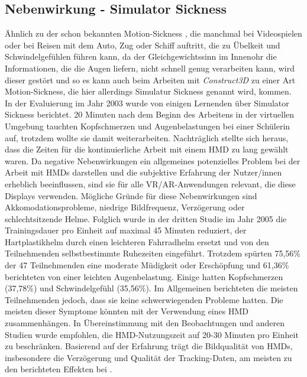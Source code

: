 \documentclass[deutsch]{llncs}
\begin{document}
\subsection{Nebenwirkung - Simulator Sickness}
Ähnlich zu der schon bekannten Motion-Sickness \cite{motionsickness}, die manchmal bei Videospielen oder bei Reisen mit dem Auto, Zug oder Schiff auftritt, die zu Übelkeit und Schwindelgefühlen führen kann, da der Gleichgewichtssinn im Innenohr die Informationen, die die Augen liefern, nicht schnell genug verarbeiten kann, wird dieser gestört und so es kann auch beim Arbeiten mit \emph{Construct3D} zu einer Art Motion-Sickness, die hier allerdings
Simulatur Sickness genannt wird, kommen.
 \\
In der Evaluierung im Jahr 2003 wurde von einigen Lernenden über Simulator Sickness berichtet. 20 Minuten nach dem Beginn des Arbeitens in der virtuellen Umgebung tauchten Kopfschmerzen und Augenbelastungen bei einer Schülerin auf, trotzdem wollte sie damit weiterarbeiten. Nachträglich stellte sich heraus, dass die Zeiten für die kontinuierliche Arbeit mit einem HMD zu lang gewählt waren. Da negative Nebenwirkungen ein allgemeines potenzielles Problem bei der Arbeit mit HMDs darstellen und die subjektive Erfahrung der Nutzer/innen erheblich beeinflussen, sind sie für alle VR/AR-Anwendungen relevant, die diese Displays verwenden. Mögliche Gründe für diese Nebenwirkungen sind Akkomodationsprobleme, niedrige Bildfrequenz, Verzögerung oder schlechtsitzende Helme. 
Folglich wurde in der dritten Studie im Jahr 2005 die Trainingsdauer pro Einheit auf maximal 45 Minuten reduziert, der Hartplastikhelm durch einen leichteren Fahrradhelm ersetzt und von den Teilnehmenden selbstbestimmte Ruhezeiten eingeführt. Trotzdem spürten 75,56\% der 47 Teilnehmenden eine moderate Müdigkeit oder Erschöpfung und 61,36\% berichteten von einer leichten Augenbelastung. Einige hatten Kopfschmerzen (37,78\%) und Schwindelgefühl (35,56\%). Im Allgemeinen berichteten die meisten Teilnehmenden jedoch, dass sie keine schwerwiegenden Probleme hatten. Die meisten dieser Symptome könnten mit der Verwendung eines HMD zusammenhängen. In Übereinstimmung mit den Beobachtungen und anderen Studien wurde empfohlen, die HMD-Nutzungszeit auf 20-30 Minuten pro Einheit zu beschränken.  Basierend auf der Erfahrung trägt die Bildqualität von HMDs, insbesondere die Verzögerung und Qualität der Tracking-Daten, am meisten zu den berichteten Effekten bei \cite{Kaufmann_summaryof}.
\end{document}
